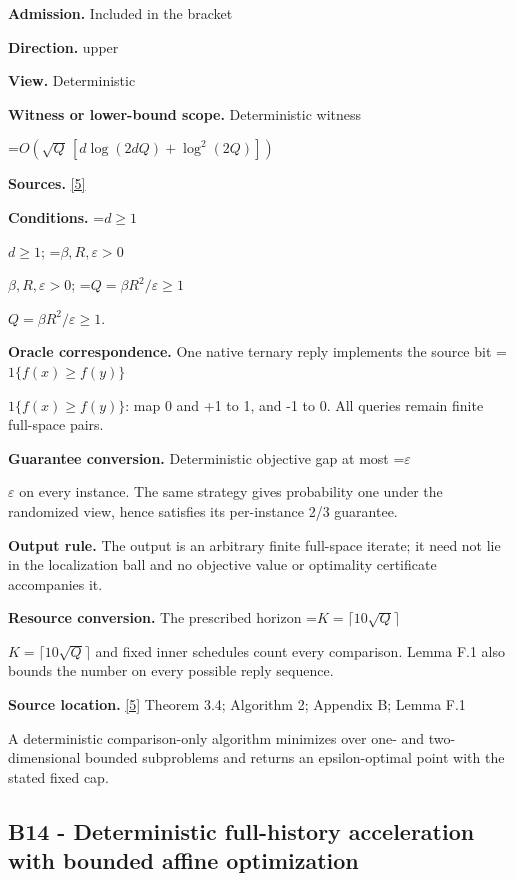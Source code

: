 \documentclass[10pt,a4paper]{article}
\newcommand{\AtlasMath}[1]{\par\begingroup\centering\setbox0=\hbox{$\displaystyle #1$}\ifdim\wd0>1.4\linewidth\typeout{ATLAS WIDE FORMULA: \the\wd0}\fi\ifdim\wd0>\linewidth\resizebox{\linewidth}{!}{\box0}\else\box0\fi\par\endgroup}
\newcommand{\AtlasInlineMath}[1]{\begingroup\setbox0=\hbox{$#1$}\ifdim\wd0>.4\linewidth\endgroup\AtlasMath{#1}\else\endgroup$#1$\fi}
\begin{document}
\textbf{Admission.} Included in the bracket



\textbf{Direction.} upper



\textbf{View.} Deterministic



\textbf{Witness or lower-bound scope.} Deterministic witness



\AtlasMath{O\!\left(\sqrt Q\,[d\log(2dQ)+\log^2(2Q)]\right)}


\textbf{Sources.} \href{https://arxiv.org/html/2611.29533v1}{[5]}



\textbf{Conditions.} \AtlasInlineMath{d\ge1}; \AtlasInlineMath{\beta,R,\varepsilon>0}; \AtlasInlineMath{Q=\beta R^2/\varepsilon\ge1}.



\textbf{Oracle correspondence.} One native ternary reply implements the source bit \AtlasInlineMath{1\{f(x)\ge f(y)\}}: map 0 and +1 to 1, and -1 to 0. All queries remain finite full-space pairs.



\textbf{Guarantee conversion.} Deterministic objective gap at most \AtlasInlineMath{\varepsilon} on every instance. The same strategy gives probability one under the randomized view, hence satisfies its per-instance 2/3 guarantee.



\textbf{Output rule.} The output is an arbitrary finite full-space iterate; it need not lie in the localization ball and no objective value or optimality certificate accompanies it.



\textbf{Resource conversion.} The prescribed horizon \AtlasInlineMath{K=\lceil10\sqrt Q\rceil} and fixed inner schedules count every comparison. Lemma F.1 also bounds the number on every possible reply sequence.



\textbf{Source location.} \href{https://arxiv.org/html/2611.29533v1}{[5]} Theorem 3.4; Algorithm 2; Appendix B; Lemma F.1



A deterministic comparison-only algorithm minimizes over one- and two-dimensional bounded subproblems and returns an epsilon-optimal point with the stated fixed cap.



\subsection{B14 - Deterministic full-history acceleration with bounded affine optimization}
\end{document}
